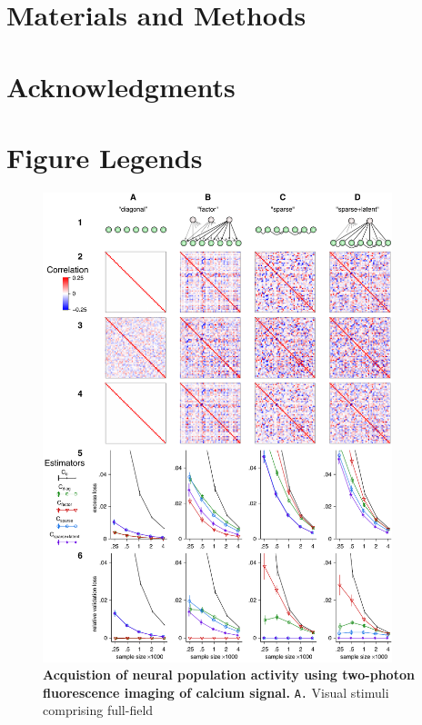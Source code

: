 \documentclass[10pt]{article}
\begin{document}
\section*{Materials and Methods}

\section*{Acknowledgments}





\section*{Figure Legends}
\begin{figure}[!ht]
\begin{center}
\includegraphics[width=4in]{figures/Figure1.pdf}
\end{center}
\caption{
{\bf Acquistion of neural population activity using two-photon fluorescence imaging of calcium signal.}  {\tt A.} Visual stimuli comprising full-field  
}
\label{Figure_label}
\end{figure}


\end{document}
